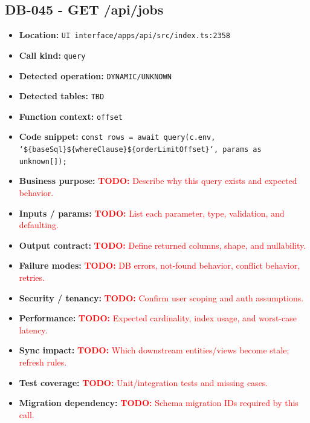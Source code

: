 \documentclass[11pt]{article}
\newcommand{\todoitem}[1]{\textcolor{red}{\textbf{TODO:} #1}}
\begin{document}
\subsection{DB-045 - GET /api/jobs}
\begin{itemize}[leftmargin=1.5em]
\item \textbf{Location:} \texttt{UI interface/apps/api/src/index.ts:2358}
\item \textbf{Call kind:} \texttt{query}
\item \textbf{Detected operation:} \texttt{DYNAMIC/UNKNOWN}
\item \textbf{Detected tables:} \texttt{TBD}
\item \textbf{Function context:} \texttt{offset}
\item \textbf{Code snippet:} \texttt{const rows = await query(c.env, `\$\{baseSql\}\$\{whereClause\}\$\{orderLimitOffset\}`, params as unknown[]);}
\item \textbf{Business purpose:} \todoitem{Describe why this query exists and expected behavior.}
\item \textbf{Inputs / params:} \todoitem{List each parameter, type, validation, and defaulting.}
\item \textbf{Output contract:} \todoitem{Define returned columns, shape, and nullability.}
\item \textbf{Failure modes:} \todoitem{DB errors, not-found behavior, conflict behavior, retries.}
\item \textbf{Security / tenancy:} \todoitem{Confirm user scoping and auth assumptions.}
\item \textbf{Performance:} \todoitem{Expected cardinality, index usage, and worst-case latency.}
\item \textbf{Sync impact:} \todoitem{Which downstream entities/views become stale; refresh rules.}
\item \textbf{Test coverage:} \todoitem{Unit/integration tests and missing cases.}
\item \textbf{Migration dependency:} \todoitem{Schema migration IDs required by this call.}
\end{itemize}
\end{document}
